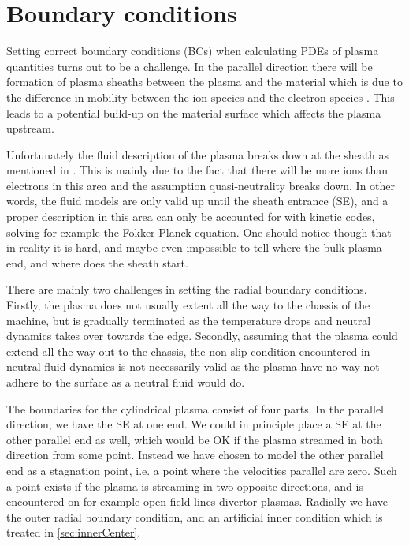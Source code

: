 \section{Boundary conditions}
\label{sec:BCs}
%
Setting correct boundary conditions (BCs) when calculating PDEs of plasma quantities turns out to be a challenge.
In the parallel direction there will be formation of plasma sheaths between the plasma and the material which is due to the difference in mobility between the ion species and the electron species \cite{Stangeby2000book}.
This leads to a potential build-up on the material surface which affects the plasma upstream.

Unfortunately the fluid description of the plasma breaks down at the sheath as mentioned in \cite{Loizu2012a}.
This is mainly due to the fact that there will be more ions than electrons in this area and the assumption quasi-neutrality breaks down.
In other words, the fluid models are only valid up until the sheath entrance (SE), and a proper description in this area can only be accounted for with kinetic codes, solving for example the Fokker-Planck equation.
One should notice though that in reality it is hard, and maybe even impossible to tell where the bulk plasma end, and where does the sheath start.

There are mainly two challenges in setting the radial boundary conditions.
Firstly, the plasma does not usually extent all the way to the chassis of the machine, but is gradually terminated as the temperature drops and neutral dynamics takes over towards the edge.
Secondly, assuming that the plasma could extend all the way out to the chassis, the non-slip condition encountered in neutral fluid dynamics \cite{Kundu2010book} is not necessarily valid as the plasma have no way not adhere to the surface as a neutral fluid would do.

The boundaries for the cylindrical plasma consist of four parts.
In the parallel direction, we have the SE at one end.
We could in principle place a SE at the other parallel end as well, which would be OK if the plasma streamed in both direction from some point.
Instead we have chosen to model the other parallel end as a stagnation point, i.e. a point where the velocities parallel are zero.
Such a point exists if the plasma is streaming in two opposite directions, and is encountered on for example open field lines  divertor plasmas.
Radially we have the outer radial boundary condition, and an artificial inner condition which is treated in \cref{sec:innerCenter}.


